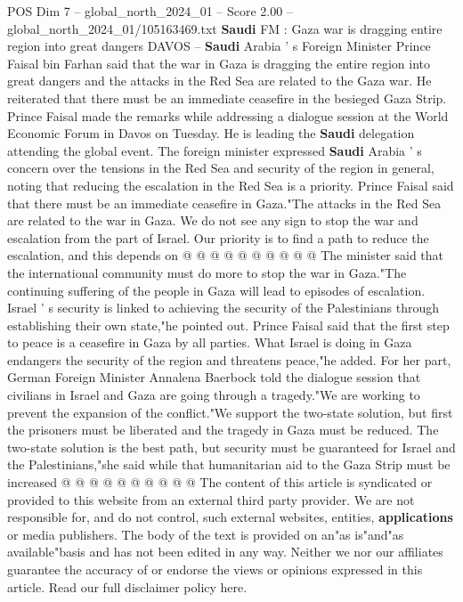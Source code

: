 \begin{textsample}{POS Dim 7 – global\_north\_2024\_01 – Score 2.00 – global\_north\_2024\_01/105163469.txt}  \label{ex:f7_pos_249}
\textbf{Saudi} FM : Gaza war is dragging entire region into great dangers DAVOS -- \textbf{Saudi} Arabia ' s Foreign Minister Prince Faisal bin Farhan said that the war in Gaza is dragging the entire region into great dangers and the attacks in the Red Sea are related to the Gaza war.
He reiterated that there must be an immediate ceasefire in the besieged Gaza Strip.
Prince Faisal made the remarks while addressing a dialogue session at the World Economic Forum in Davos on Tuesday.
He is leading the \textbf{Saudi} delegation attending the global event.
The foreign minister expressed \textbf{Saudi} Arabia ' s concern over the tensions in the Red Sea and security of the region in general, noting that reducing the escalation in the Red Sea is a priority.
Prince Faisal said that there must be an immediate ceasefire in Gaza."The attacks in the Red Sea are related to the war in Gaza.
We do not see any sign to stop the war and escalation from the part of Israel.
Our priority is to find a path to reduce the escalation, and this depends on @ @ @ @ @ @ @ @ @ @ The minister said that the international community must do more to stop the war in Gaza."The continuing suffering of the people in Gaza will lead to episodes of escalation.
Israel ' s security is linked to achieving the security of the Palestinians through establishing their own state,"he pointed out.
Prince Faisal said that the first step to peace is a ceasefire in Gaza by all parties.
What Israel is doing in Gaza endangers the security of the region and threatens peace,"he added.
For her part, German Foreign Minister Annalena Baerbock told the dialogue session that civilians in Israel and Gaza are going through a tragedy."We are working to prevent the expansion of the conflict."We support the two-state solution, but first the prisoners must be liberated and the tragedy in Gaza must be reduced.
The two-state solution is the best path, but security must be guaranteed for Israel and the Palestinians,"she said while that humanitarian aid to the Gaza Strip must be increased @ @ @ @ @ @ @ @ @ @ The content of this article is syndicated or provided to this website from an external third party provider.
We are not responsible for, and do not control, such external websites, entities, \textbf{applications} or media publishers.
The body of the text is provided on an"as is"and"as available"basis and has not been edited in any way.
Neither we nor our affiliates guarantee the accuracy of or endorse the views or opinions expressed in this article.
Read our full disclaimer policy here.

\end{textsample}
